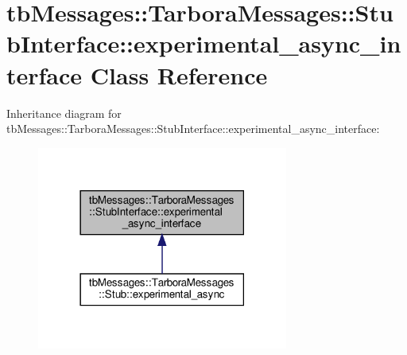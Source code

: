 \hypertarget{classtbMessages_1_1TarboraMessages_1_1StubInterface_1_1experimental__async__interface}{}\section{tb\+Messages\+:\+:Tarbora\+Messages\+:\+:Stub\+Interface\+:\+:experimental\+\_\+async\+\_\+interface Class Reference}
\label{classtbMessages_1_1TarboraMessages_1_1StubInterface_1_1experimental__async__interface}


Inheritance diagram for tb\+Messages\+:\+:Tarbora\+Messages\+:\+:Stub\+Interface\+:\+:experimental\+\_\+async\+\_\+interface\+:
\nopagebreak
\begin{figure}[H]
\begin{center}
\leavevmode
\includegraphics[width=234pt]{classtbMessages_1_1TarboraMessages_1_1StubInterface_1_1experimental__async__interface__inherit__graph}
\end{center}
\end{figure}
